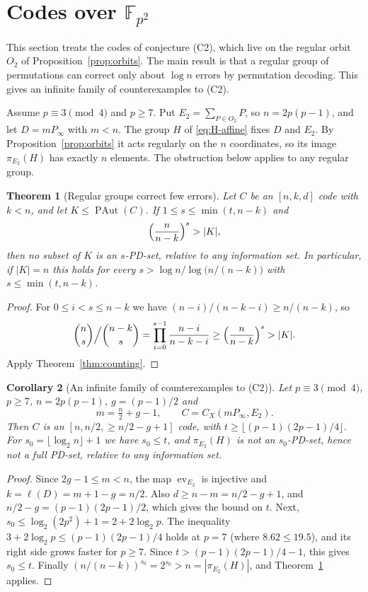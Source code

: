 \documentclass[12pt,letterpaper]{article}
\newtheorem{theorem}{Theorem}[section]
\newtheorem{corollary}[theorem]{Corollary}
\theoremstyle{definition}
\theoremstyle{remark}
\numberwithin{equation}{section}
\newcommand{\F}{\mathbb{F}}
\newcommand{\ev}{\operatorname{ev}}
\newcommand{\PAut}{\operatorname{PAut}}
\begin{document}
\section{\texorpdfstring{Codes over $\F_{p^2}$}{Codes over F\_\{p\textasciicircum 2\}}}\label{sec:fp2-codes}

This section treats the codes of conjecture (C2), which live on the
regular orbit $O_2$ of Proposition~\ref{prop:orbits}. The main result is
that a regular group of permutations can correct only about $\log n$
errors by permutation decoding. This gives an infinite family of
counterexamples to (C2).

Assume $p\equiv3\pmod4$ and $p\ge7$.  Put $E_2=\sum_{P\in O_2}P$, so
$n=2p(p-1)$, and let $D=mP_\infty$ with $m<n$.  The group $H$ of
\eqref{eq:H-affine} fixes $D$ and $E_2$.  By
Proposition~\ref{prop:orbits} it acts regularly on the $n$ coordinates,
so its image $\pi_{E_2}(H)$ has exactly $n$ elements.  The obstruction
below applies to any regular group.

\begin{theorem}[Regular groups correct few errors]\label{thm:regular}
Let $C$ be an $[n,k,d]$ code with $k<n$, and let $K\le\PAut(C)$.  If
$1\le s\le\min(t,n-k)$ and
\[
\Bigl(\frac{n}{n-k}\Bigr)^{s}>|K|,
\]
then no subset of $K$ is an $s$-PD-set, relative to any information set.
In particular, if $|K|=n$ this holds for every
$s>\log n/\log\bigl(n/(n-k)\bigr)$ with $s\le\min(t,n-k)$.
\end{theorem}
\begin{proof}
For $0\le i<s\le n-k$ we have $(n-i)/(n-k-i)\ge n/(n-k)$, so
\[
\binom ns\Big/\binom{n-k}s=\prod_{i=0}^{s-1}\frac{n-i}{n-k-i}
\ge\Bigl(\frac n{n-k}\Bigr)^s>|K|.
\]
Apply Theorem~\ref{thm:counting}.
\end{proof}

\begin{corollary}[An infinite family of counterexamples to (C2)]
\label{cor:family}
Let $p\equiv3\pmod4$, $p\ge7$, $n=2p(p-1)$, $g=(p-1)/2$ and
\[
m=\tfrac n2+g-1,\qquad C=C_X(mP_\infty,E_2).
\]
Then $C$ is an $[n,n/2,\ge n/2-g+1]$ code, with
$t\ge\lfloor(p-1)(2p-1)/4\rfloor$.  For
$s_0=\lfloor\log_2n\rfloor+1$ we have $s_0\le t$, and $\pi_{E_2}(H)$ is
not an $s_0$-PD-set, hence not a full PD-set, relative to any information
set.
\end{corollary}
\begin{proof}
Since $2g-1\le m<n$, the map $\ev_{E_2}$ is injective and
$k=\ell(D)=m+1-g=n/2$.  Also $d\ge n-m=n/2-g+1$, and
$n/2-g=(p-1)(2p-1)/2$, which gives the bound on $t$.  Next,
$s_0\le\log_2(2p^2)+1=2+2\log_2p$.  The inequality
$3+2\log_2p\le(p-1)(2p-1)/4$ holds at $p=7$ (where $8.62\le19.5$), and
its right side grows faster for $p\ge7$.  Since
$t>(p-1)(2p-1)/4-1$, this gives $s_0\le t$.  Finally
$(n/(n-k))^{s_0}=2^{s_0}>n=|\pi_{E_2}(H)|$, and
Theorem~\ref{thm:regular} applies.
\end{proof}
\end{document}
